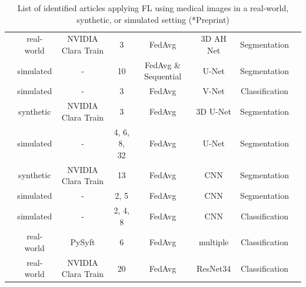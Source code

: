 \begin{table}
\begin{adjustbox}{width=1.0\textheight}
\begin{tabular}{cccccccc}
    \cite{Sarma2021FederatedSharing}                    & real-world & NVIDIA Clara Train   & 3             & FedAvg                    & 3D AH Net         & Segmentation \\
    \cite{Sheller2020FederatedData}                     & simulated  & -                        & 10            & FedAvg \& Sequential      & U-Net             & Segmentation \\
    \cite{Baheti2020FederatedNodules}                   & simulated  & -                        & 3             & FedAvg                    & V-Net             & Classification \\    
    \cite{Yang2021FederatedJapan}                       & synthetic  & NVIDIA Clara Train   & 3             & FedAvg                    & 3D U-Net          & Segmentation \\  
    \cite{Sheller2019Multi-institutionalSegmentation}   & simulated  & -                        & 4, 6, 8, 32   & FedAvg                    & U-Net             & Segmentation \\
    \cite{Li2019Privacy-preservingSegmentation}         & synthetic  & NVIDIA Clara Train   & 13            & FedAvg                    & CNN               & Segmentation \\
    \cite{Andreux2020SiloedDatasets}                    & simulated  & -                        & 2, 5          & FedAvg                    & CNN               & Segmentation \\
    \cite{Yan2020Variation-AwareData}                   & simulated  & -                        & 2, 4, 8       & FedAvg                    & CNN               & Classification \\
    \cite{Lee2021FederatedEnvironment}                  & real-world & PySyft                   & 6             & FedAvg                    & multiple          & Classification \\
    \cite{Flores2021FederatedPatients}\rlap{*}          & real-world & NVIDIA Clara Train   & 20            & FedAvg                    & ResNet34          & Classification \\
  \end{tabular}
  \end{adjustbox}
  \caption[Identified articles applying FL using medical image data]{List of identified articles applying FL using medical images in a real-world, synthetic, or simulated setting (*Preprint)}
  \label{tab:LitSearch}
\end{table}

